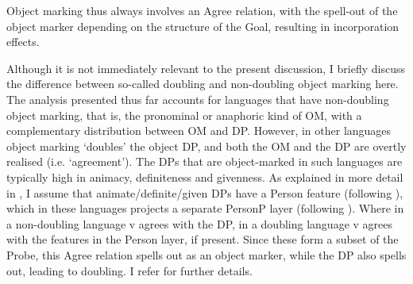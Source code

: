 \documentclass[output=paper
,modfonts
,nonflat]{langsci/langscibook}
\begin{document}
\begin{exe} 
	\ex	{} 
	\xlist
	\endxlist
\end{exe} 	
Object marking thus always involves an Agree relation, with the spell-out of the object marker depending on the structure of the Goal, resulting in incorporation effects.

Although it is not immediately relevant to the present discussion, I briefly discuss the difference between so-called doubling and non-doubling object marking here. The analysis presented thus far accounts for languages that have non-doubling object marking, that is, the pronominal or anaphoric kind of OM, with a complementary distribution between OM and DP. However, in other languages object marking ‘doubles’ the object DP, and both the OM and the DP are overtly realised (i.e. ‘agreement’). The DPs that are object-marked in such languages are typically high in animacy, definiteness and givenness. As explained in more detail in \citet{Van_der_Wal2015}, I assume that animate/definite/given DPs have a Person feature (following \citealt{Richards2008, Richards2015}), 
which in these languages projects a separate PersonP layer (following \citealt{Höhn2017}).  
Where in a non-doubling language v agrees with the DP, in a doubling language v agrees with the features in the Person layer, if present. Since these form a subset of the Probe, this Agree relation spells out as an object marker, while the DP also spells out, leading to doubling. I refer \citet{Van_der_Wal2015} for further details.
\end{document}
